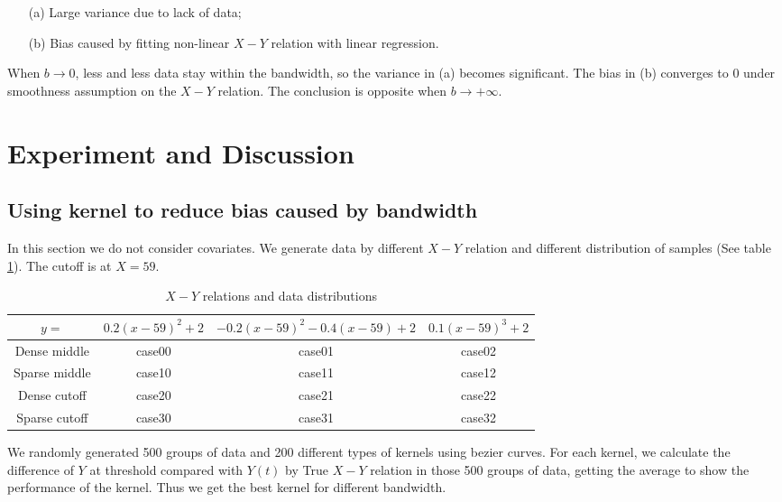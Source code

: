 \documentclass[a4 paper,12pt]{article}
\begin{document}
\begin{enumerate}
   \item[(a)] Large variance due to lack of data;
   \item[(b)] Bias caused by fitting non-linear $X-Y$ relation with linear regression.
\end{enumerate}

When $b\to 0$, less and less data stay within the bandwidth, so the variance in (a) becomes significant. The bias in (b) converges to $0$ under smoothness assumption on the $X-Y$ relation. The conclusion is opposite when $b\to+\infty$.


\section{Experiment and Discussion}

\subsection{Using kernel to reduce bias caused by bandwidth}

In this section we do not consider covariates. We generate data by different $X-Y$ relation and different distribution of samples (See table \ref{table:kernels_test}). The cutoff is at $X=59$.

\begin{table}[h]
	\centering
   \begin{tabular}{|c|c|c|c|}
      \hline
      $y=$&$0.2(x-59)^2+2$&$-0.2(x-59)^2-0.4(x-59)+2$&$0.1(x-59)^3+2$\\
      \hline
      Dense middle&case00&case01&case02\\
      \hline
      Sparse middle&case10&case11&case12\\
      \hline
      Dense cutoff&case20&case21&case22\\
      \hline
      Sparse cutoff&case30&case31&case32\\
      \hline
   \end{tabular}
   \caption{$X-Y$ relations and data distributions}
   \label{table:kernels_test}
\end{table}

We randomly generated 500 groups of data and 200 different types of kernels using bezier curves. For each kernel, we calculate the difference of $Y$ at threshold compared with $Y(t)$ by True $X-Y$ relation in those 500 groups of data, getting the average to show the performance of the kernel. Thus we get the best kernel for different bandwidth.
\end{document}
